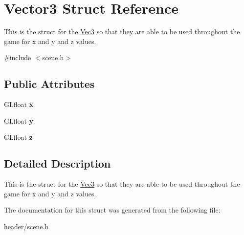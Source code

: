 \hypertarget{structVector3}{
\section{Vector3 Struct Reference}
\label{structVector3}
}


This is the struct for the \hyperlink{classVec3}{Vec3} so that they are able to be used throughout the game for x and y and z values.  


{\ttfamily \#include $<$scene.h$>$}\subsection*{Public Attributes}
\begin{DoxyCompactItemize}
\item 
\hypertarget{structVector3_a6ec3f95e5fb0ee725d5fbdb8f17cebf6}{
GLfloat {\bfseries x}}
\label{structVector3_a6ec3f95e5fb0ee725d5fbdb8f17cebf6}

\item 
\hypertarget{structVector3_a0e05f1adf7616989f7f89fed6cb4e873}{
GLfloat {\bfseries y}}
\label{structVector3_a0e05f1adf7616989f7f89fed6cb4e873}

\item 
\hypertarget{structVector3_a062291c1bffe3f872c3fe6eda01f897e}{
GLfloat {\bfseries z}}
\label{structVector3_a062291c1bffe3f872c3fe6eda01f897e}

\end{DoxyCompactItemize}


\subsection{Detailed Description}
This is the struct for the \hyperlink{classVec3}{Vec3} so that they are able to be used throughout the game for x and y and z values. 

The documentation for this struct was generated from the following file:\begin{DoxyCompactItemize}
\item 
header/scene.h\end{DoxyCompactItemize}
